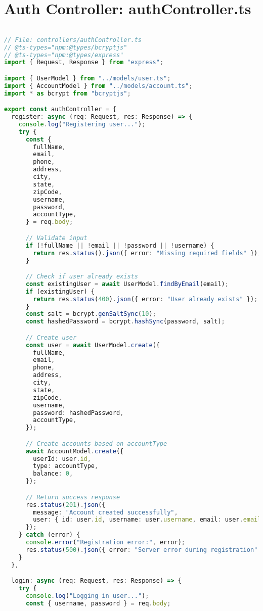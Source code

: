 \section{Auth Controller: authController.ts}
\begin{lstlisting}[language=TypeScript]

// File: controllers/authController.ts
// @ts-types="npm:@types/bcryptjs"
// @ts-types="npm:@types/express"
import { Request, Response } from "express";

import { UserModel } from "../models/user.ts";
import { AccountModel } from "../models/account.ts";
import * as bcrypt from "bcryptjs";

export const authController = {
  register: async (req: Request, res: Response) => {
    console.log("Registering user...");
    try {
      const {
        fullName,
        email,
        phone,
        address,
        city,
        state,
        zipCode,
        username,
        password,
        accountType,
      } = req.body;

      // Validate input
      if (!fullName || !email || !password || !username) {
        return res.status().json({ error: "Missing required fields" });
      }

      // Check if user already exists
      const existingUser = await UserModel.findByEmail(email);
      if (existingUser) {
        return res.status(400).json({ error: "User already exists" });
      }
      const salt = bcrypt.genSaltSync(10);
      const hashedPassword = bcrypt.hashSync(password, salt);

      // Create user
      const user = await UserModel.create({
        fullName,
        email,
        phone,
        address,
        city,
        state,
        zipCode,
        username,
        password: hashedPassword,
        accountType,
      });

      // Create accounts based on accountType
      await AccountModel.create({
        userId: user.id,
        type: accountType,
        balance: 0,
      });

      // Return success response
      res.status(201).json({
        message: "Account created successfully",
        user: { id: user.id, username: user.username, email: user.email },
      });
    } catch (error) {
      console.error("Registration error:", error);
      res.status(500).json({ error: "Server error during registration" });
    }
  },

  login: async (req: Request, res: Response) => {
    try {
      console.log("Logging in user...");
      const { username, password } = req.body;


\end{lstlisting}
